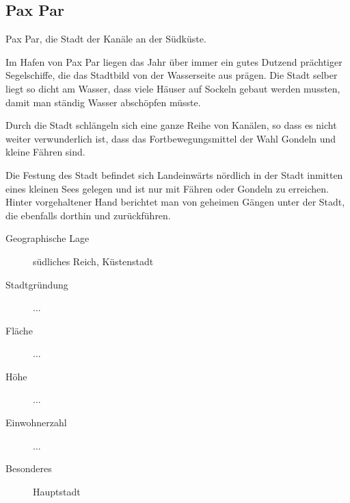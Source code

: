 \subsection{Pax Par}
\par Pax Par, die Stadt der Kanäle an der Südküste.
\par Im Hafen von Pax Par liegen das Jahr über immer ein gutes Dutzend prächtiger Segelschiffe, die das Stadtbild von
der Wasserseite aus prägen. Die Stadt selber liegt so dicht am Wasser, dass viele Häuser auf Sockeln gebaut werden mussten,
damit man ständig Wasser abschöpfen müsste.
\par Durch die Stadt schlängeln sich eine ganze Reihe von Kanälen, so dass es nicht weiter verwunderlich ist, dass das
Fortbewegungsmittel der Wahl Gondeln und kleine Fähren sind.
\par Die Festung des Stadt befindet sich Landeinwärts nördlich in der Stadt inmitten eines kleinen Sees gelegen
und ist nur mit Fähren oder Gondeln zu erreichen. Hinter vorgehaltener Hand berichtet man von geheimen Gängen unter der
Stadt, die ebenfalls dorthin und zurückführen.

\begin{description}
\item [Geographische Lage] südliches Reich, Küstenstadt
\item [Stadtgründung] ...
\item [Fläche] ...
\item [Höhe] ...
\item [Einwohnerzahl] ...
\item [Besonderes] Hauptstadt
\end{description}